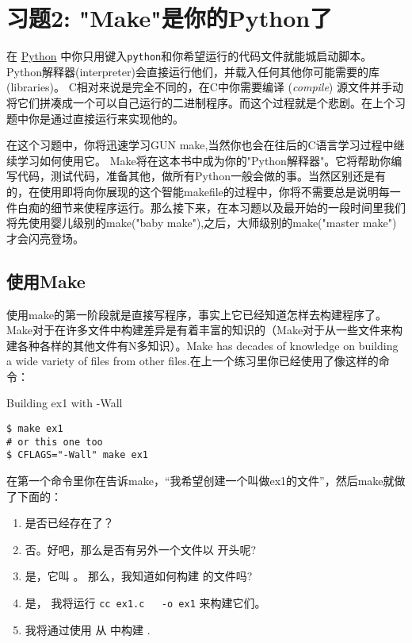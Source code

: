 \chapter{习题2: "Make"是你的Python了}

在 \href{http://learnpythonthehardway.org}{Python} 中你只用键入\verb|python|和你希望运行的代码文件就能城启动脚本。Python解释器(interpreter)会直接运行他们，并载入任何其他你可能需要的库(libraries)。 C相对来说是完全不同的，在C中你需要编译 (\emph{compile}) 源文件并手动将它们拼凑成一个可以自己运行的二进制程序。而这个过程就是个悲剧。在上个习题中你是通过直接运行来实现他的。

在这个习题中，你将迅速学习GUN make,当然你也会在往后的C语言学习过程中继续学习如何使用它。 Make将在这本书中成为你的"Python解释器"。它将帮助你编写代码，测试代码，准备其他，做所有Python一般会做的事。当然区别还是有的，在使用即将向你展现的这个智能makefile的过程中，你将不需要总是说明每一件白痴的细节来使程序运行。那么接下来，在本习题以及最开始的一段时间里我们将先使用婴儿级别的make("baby make"),之后，大师级别的make("master make")才会闪亮登场。


\section{使用Make}

使用make的第一阶段就是直接写程序，事实上它已经知道怎样去构建程序了。Make对于在许多文件中构建差异是有着丰富的知识的（Make对于从一些文件来构建各种各样的其他文件有N多知识）。Make has decades of knowledge on building
a wide variety of files from other files.在上一个练习里你已经使用了像这样的命令：

\begin{Terminal}{Building ex1 with -Wall}
\begin{lstlisting}
$ make ex1
# or this one too
$ CFLAGS="-Wall" make ex1
\end{lstlisting}
\end{Terminal}

在第一个命令里你在告诉make，“我希望创建一个叫做ex1的文件”，然后make就做了下面的：

\begin{enumerate}
\item {} 是否已经存在了？
\item 否。好吧，那么是否有另外一个文件以  开头呢?
\item 是，它叫 。 那么，我知道如何构建  的文件吗?
\item 是， 我将运行 \verb|cc ex1.c   -o ex1| 来构建它们。
\item 我将通过使用  从  中构建 .
\end{enumerate}

